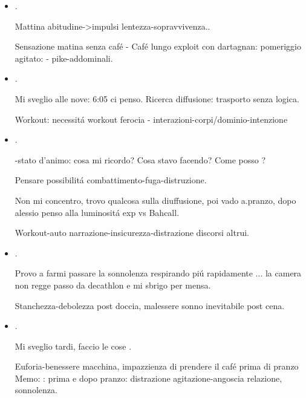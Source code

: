 \begin{itemize}
workout ferocia?

Doccia distrazione pensiero parola impulso - mi asciugo ho fame/sono stanco compro birra ed ho labbra legnose - soprattutto stanchezza/sonnolenza - attesa turno - voce parole a rientrare.

\item {}.

Mattina abitudine->impulsi lentezza-sopravvivenza..

Sensazione matina senza caf\'e - Caf\'e lungo exploit con dartagnan: pomeriggio agitato:  -  pike-addominali.

\item {}.

Mi sveglio alle nove: 6:05 ci penso. Ricerca diffusione: trasporto senza logica.

Workout: necessit\'a workout ferocia - interazioni-corpi/dominio-intenzione

\item {}.

-stato d'animo: cosa mi ricordo? Cosa stavo facendo? Come posso ?

Pensare possibilit\'a combattimento-fuga-distruzione.

Non mi concentro, trovo qualcosa sulla diuffusione, poi vado a.pranzo, dopo alessio penso alla luminosit\'a exp vs Bahcall.

Workout-auto narrazione-insicurezza-distrazione discorsi altrui.

\item {}.

Provo a farmi passare la sonnolenza respirando pi\'u rapidamente ... la camera non regge passo da decathlon e mi sbrigo per mensa.

Stanchezza-debolezza post doccia, malessere sonno inevitabile post cena.

\item {}.

Mi sveglio tardi, faccio le cose .

Euforia-benessere macchina, impazzienza di prendere il caf\'e prima di pranzo
Memo: : prima e dopo pranzo: distrazione agitazione-angoscia relazione, sonnolenza.


\end{itemize}
